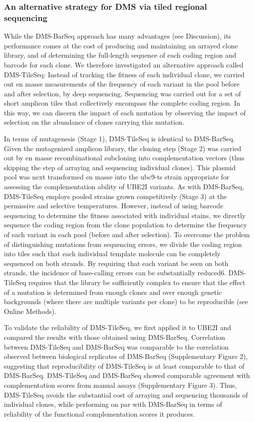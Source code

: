\subsubsection{An alternative strategy for DMS via tiled regional sequencing}

While the DMS-BarSeq approach has many advantages (see Discussion), its performance comes at the cost of producing and maintaining an arrayed clone library, and of determining the full-length sequence of each coding region and barcode for each clone. We therefore investigated an alternative approach called DMS-TileSeq: Instead of tracking the fitness of each individual clone, we carried out en masse measurements of the frequency of each variant in the pool before and after selection, by deep sequencing.  Sequencing was carried out for a set of short amplicon tiles that collectively encompass the complete coding region.  In this way, we can discern the impact of each mutation by observing the impact of selection on the abundance of clones carrying this mutation.

In terms of mutagenesis (Stage 1), DMS-TileSeq is identical to DMS-BarSeq.  Given the mutagenized amplicon library, the cloning step (Stage 2) was carried out by en masse recombinational subcloning into complementation vectors (thus skipping the step of arraying and sequencing individual clones).  This plasmid pool was next transformed en masse into the ubc9-ts strain appropriate for assessing the complementation ability of UBE2I variants. As with DMS-BarSeq, DMS-TileSeq employs pooled strains grown competitively (Stage 3) at the permissive and selective temperatures. However, instead of using barcode sequencing to determine the fitness associated with individual stains, we directly sequence the coding region from the clone population to determine the frequency of each variant in each pool (before and after selection). To overcome the problem of distinguishing mutations from sequencing errors, we divide the coding region into tiles such that each individual template molecule can be completely sequenced on both strands.  By requiring that each variant be seen on both strands, the incidence of base-calling errors can be substantially reduced6.  DMS-TileSeq requires that the library be sufficiently complex to ensure that the effect of a mutation is determined from enough clones and over enough genetic backgrounds (where there are multiple variants per clone) to be reproducible (see Online Methods).

To validate the reliability of DMS-TileSeq, we first applied it to UBE2I and compared the results with those obtained using DMS-BarSeq. Correlation between DMS-TileSeq and DMS-BarSeq was comparable to the correlation observed between biological replicates of DMS-BarSeq (Supplementary Figure 2), suggesting that reproducibility of DMS-TileSeq is at least comparable to that of DMS-BarSeq. DMS-TileSeq and DMS-BarSeq showed comparable agreement with complementation scores from manual assays (Supplementary Figure 3).  Thus, DMS-TileSeq avoids the substantial cost of arraying and sequencing thousands of individual clones, while performing on par with DMS-BarSeq in terms of reliability of the functional complementation scores it produces.


